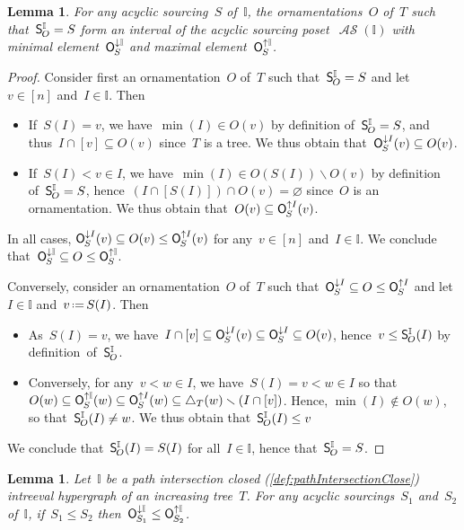 \documentclass{amsart}
\newtheorem{lemma}[theorem]{Lemma}
\theoremstyle{definition}
\newcommand{\ssm}{\smallsetminus} %
\newcommand{\eqdef}{\mbox{\,\raisebox{0.2ex}{\scriptsize\ensuremath{\mathrm:}}\ensuremath{=}\,}} %
\newcommand{\mymap}[2]{\mathsf{#1}_{\hspace{-.7pt}#2}}
\newcommand{\minorn}[2]{\mymap{O}{#1}^{\downarrow#2}}  %
\newcommand{\maxorn}[2]{\mymap{O}{#1}^{\uparrow#2}}  %
\newcommand{\sour}[1]{\mymap{S}{#1}}  %
\DeclareMathOperator{\ASour}{\mathcal{AS}}  %
\newcommand{\II}{\mathbb I} %
\begin{document}
\begin{lemma}
\label{lem:Sour2OrnIntreeval2}
For any acyclic sourcing~$S$ of~$\II$, the ornamentations~$O$ of~$T$ such that~$\sour{O}^\II = S$ form an interval of the acyclic sourcing poset~$\ASour(\II)$ with minimal element~$\minorn{S}{\II}$ and maximal element~$\maxorn{S}{\II}$.
\end{lemma}

\begin{proof}
Consider first an ornamentation~$O$ of~$T$ such that~$\sour{O}^\II = S$ and let~$v \in [n]$ and~$I \in \II$. Then
\begin{itemize}
\item If~$S(I) = v$, we have~$\min(I) \in O(v)$ by definition of~$\sour{O}^\II = S$, and thus~$I \cap [v] \subseteq O(v)$ since~$T$ is a tree.
We thus obtain that~$\minorn{S}{I}(v) \subseteq O(v)$.
\item If~$S(I) < v \in I$, we have~$\min(I) \in O(S(I)) \ssm O(v)$ by definition of~$\sour{O}^\II = S$, hence~$(I \cap [S(I)]) \cap O(v) = \varnothing$ since~$O$ is an ornamentation.
We thus obtain that~$O(v) \subseteq \maxorn{S}{I}(v)$.
\end{itemize}
In all cases, $\minorn{S}{I}(v) \subseteq O(v) \le \maxorn{S}{I}(v)$ for any~$v \in [n]$ and~$I \in \II$.
We conclude that~$\minorn{S}{\II} \subseteq O \le \maxorn{S}{\II}$.

Conversely, consider an ornamentation~$O$ of~$T$ such that~$\minorn{S}{I} \subseteq O \le \maxorn{S}{I}$ and let~$I \in \II$ and~$v \eqdef S(I)$. Then
\begin{itemize}
\item As~$S(I) = v$, we have~$I \cap [v] \subseteq \minorn{S}{I}(v) \subseteq \minorn{S}{I} \subseteq O(v)$, hence~$v \le \sour{O}^\II(I)$ by definition~of~$\sour{O}^\II$.
\item Conversely, for any~$v < w \in I$, we have~$S(I) = v < w \in I$ so that~$O(w) \subseteq \maxorn{S}{\II}(w) \subseteq \maxorn{S}{I}(w) \subseteq \triangle_T(w) \ssm (I \cap [v])$. Hence, $\min(I) \notin O(w)$, so that~$\sour{O}^\II(I) \ne w$. We thus obtain that~$\sour{O}^\II(I) \le v$
\end{itemize}
We conclude that~$\sour{O}^\II(I) = S(I)$ for all~$I \in \II$, hence that~$\sour{O}^\II = S$.
\end{proof}

\begin{lemma}
\label{lem:Sour2OrnIntreeval3}
Let~$\II$ be a path intersection closed (\cref{def:pathIntersectionClose}) intreeval hypergraph of an increasing tree~$T$.
For any acyclic sourcings~$S_1$ and~$S_2$ of~$\II$, if~$S_1 \le S_2$ then~$\minorn{S_1}{\II} \le \maxorn{S_2}{\II}$.
\end{lemma}
\end{document}
